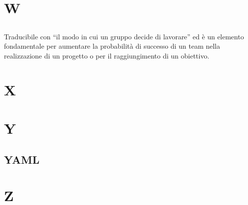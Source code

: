 \documentclass{classes/base}
\begin{document}
    \section*{W}
        \subsection*{}
        Traducibile con “il modo in cui un gruppo decide di lavorare” ed è un elemento fondamentale per aumentare la probabilità di successo di un team nella realizzazione di un progetto o per il raggiungimento di un obiettivo.  
        \newpage  
    \section*{X}
    \newpage  
    \section*{Y}
        \subsection*{YAML}
        \newpage  
    \section*{Z}
\end{document}
